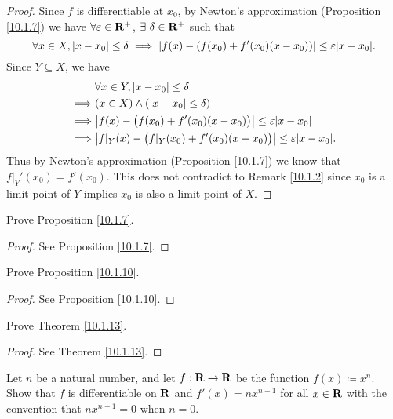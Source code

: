 \begin{proof}
    Since \(f\) is differentiable at \(x_0\), by Newton's approximation (Proposition \ref{10.1.7}) we have \(\forall \varepsilon \in \mathbf{R}^+\), \(\exists\ \delta \in \mathbf{R}^+\) such that
    \[
        \forall x \in X, \abs{x - x_0} \leq \delta \implies \abs{f(x) - (f(x_0) + f'(x_0)(x - x_0))} \leq \varepsilon \abs{x - x_0}.
    \]
    Since \(Y \subseteq X\), we have
    \begin{align*}
                 & \forall x \in Y, \abs{x - x_0} \leq \delta                                             \\
        \implies & (x \in X) \land (\abs{x - x_0} \leq \delta)                                            \\
        \implies & \abs{f(x) - \big(f(x_0) + f'(x_0)(x - x_0)\big)} \leq \varepsilon \abs{x - x_0}        \\
        \implies & \abs{f|_Y(x) - \big(f|_Y(x_0) + f'(x_0)(x - x_0)\big)} \leq \varepsilon \abs{x - x_0}.
    \end{align*}
    Thus by Newton's approximation (Proposition \ref{10.1.7}) we know that \(f|_Y'(x_0) = f'(x_0)\).
    This does not contradict to Remark \ref{10.1.2} since \(x_0\) is a limit point of \(Y\) implies \(x_0\) is also a limit point of \(X\).
\end{proof}

\begin{exercise}\label{ex 10.1.2}
    Prove Proposition \ref{10.1.7}.
\end{exercise}

\begin{proof}
    See Proposition \ref{10.1.7}.
\end{proof}

\begin{exercise}\label{ex 10.1.3}
    Prove Proposition \ref{10.1.10}.
\end{exercise}

\begin{proof}
    See Proposition \ref{10.1.10}.
\end{proof}

\begin{exercise}\label{ex 10.1.4}
    Prove Theorem \ref{10.1.13}.
\end{exercise}

\begin{proof}
    See Theorem \ref{10.1.13}.
\end{proof}

\begin{exercise}\label{ex 10.1.5}
    Let \(n\) be a natural number, and let \(f : \mathbf{R} \to \mathbf{R}\) be the function \(f(x) \coloneqq x^n\).
    Show that \(f\) is differentiable on \(\mathbf{R}\) and \(f'(x) = n x^{n - 1}\) for all \(x \in \mathbf{R}\) with the convention that \(n x^{n - 1} = 0\) when \(n = 0\).
\end{exercise}

